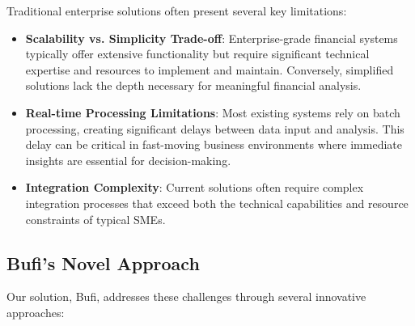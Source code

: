 \documentclass[conference]{IEEEtran}
\begin{document}
Traditional enterprise solutions often present several key limitations:
\begin{itemize}
\item \textbf{Scalability vs. Simplicity Trade-off}: Enterprise-grade financial systems typically offer extensive functionality but require significant technical expertise and resources to implement and maintain. Conversely, simplified solutions lack the depth necessary for meaningful financial analysis.
\item \textbf{Real-time Processing Limitations}: Most existing systems rely on batch processing, creating significant delays between data input and analysis. This delay can be critical in fast-moving business environments where immediate insights are essential for decision-making.
\item \textbf{Integration Complexity}: Current solutions often require complex integration processes that exceed both the technical capabilities and resource constraints of typical SMEs.
\end{itemize}

\subsection{Bufi's Novel Approach}
Our solution, Bufi, addresses these challenges through several innovative approaches:
\end{document}
